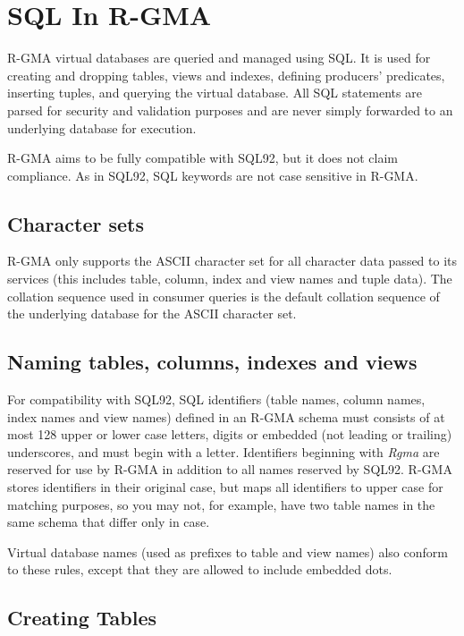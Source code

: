 \section{SQL In R-GMA}\label{sec:SQL}

R-GMA virtual databases are queried and managed using SQL. It is used
for creating and dropping tables, views and indexes, defining
producers' predicates, inserting tuples, and querying the virtual
database.  All SQL statements are parsed for security and validation
purposes and are never simply forwarded to an underlying database for
execution.

R-GMA aims to be fully compatible with SQL92, but it does not claim
compliance.  As in SQL92, SQL keywords are not case sensitive in
R-GMA.

\subsection{Character sets}\label{sec:SQLCharacterSets}

R-GMA only supports the ASCII character set for all character data
passed to its services (this includes table, column, index and view
names and tuple data). The collation sequence used in consumer queries
is the default collation sequence of the underlying database for the ASCII
character set.

\subsection{Naming tables, columns, indexes and views}\label{sec:SQLNaming}

For compatibility with SQL92, SQL identifiers (table names, column
names, index names and view names) defined in an R-GMA schema must
consists of at most 128 upper or lower case letters, digits or
embedded (not leading or trailing) underscores, and must begin with a
letter. Identifiers beginning with \textit{Rgma} are reserved for use
by R-GMA in addition to all names reserved by SQL92. R-GMA stores
identifiers in their original case, but maps all identifiers to upper
case for matching purposes, so you may not, for example, have two
table names in the same schema that differ only in case.

Virtual database names (used as prefixes to table and view names) also
conform to these rules, except that they are allowed to include
embedded dots.

\subsection{Creating Tables}\label{sec:SQLCreateTable}

